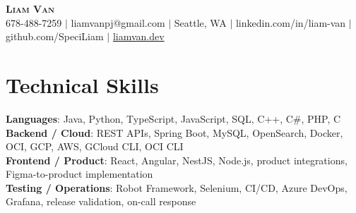 \documentclass[letterpaper,11pt]{article}
\begin{document}

%
\begin{center}
    \textbf{\Huge \scshape Liam Van} \\ \vspace{1pt}
    \small 678-488-7259 $|$ liamvanpj@gmail.com $|$ Seattle, WA $|$
    linkedin.com/in/liam-van $|$ github.com/SpeciLiam $|$ \href{https://liamvan.dev}{liamvan.dev}

\end{center}

\section{Technical Skills}
 \begin{itemize}[leftmargin=0.15in, label={}]
    \small{\item{
     \textbf{Languages}{: Java, Python, TypeScript, JavaScript, SQL, C++, C\#, PHP, C} \\
     \textbf{Backend / Cloud}{: REST APIs, Spring Boot, MySQL, OpenSearch, Docker, OCI, GCP, AWS, GCloud CLI, OCI CLI} \\
     \textbf{Frontend / Product}{: React, Angular, NestJS, Node.js, product integrations, Figma-to-product implementation} \\
     \textbf{Testing / Operations}{: Robot Framework, Selenium, CI/CD, Azure DevOps, Grafana, release validation, on-call response} \\
    }}
 \end{itemize}
%

\end{document}
